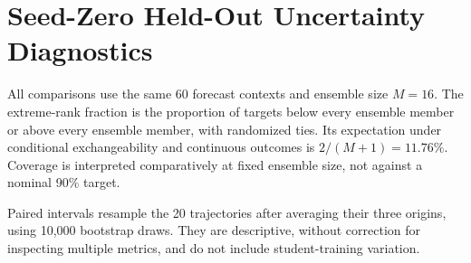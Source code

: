 \section{Seed-Zero Held-Out Uncertainty Diagnostics}\label{app:seed0-calibration}
\begin{table}[t]
\caption{Seed-zero held-out uncertainty diagnostics, averaged over the 60 one-interval test contexts. RMS spread uses unbiased sample variance; coverage and extreme ranks are percentages.}
\label{tab:seed0-calibration}
\centering
{}
\end{table}
All comparisons use the same 60 forecast contexts and ensemble size $M=16$. The extreme-rank fraction is the proportion of targets below every ensemble member or above every ensemble member, with randomized ties. Its expectation under conditional exchangeability and continuous outcomes is $2/(M+1)=11.76\%$. Coverage is interpreted comparatively at fixed ensemble size, not against a nominal 90\% target. 

Paired intervals resample the 20 trajectories after averaging their three origins, using 10,000 bootstrap draws. They are descriptive, without correction for inspecting multiple metrics, and do not include student-training variation. 
